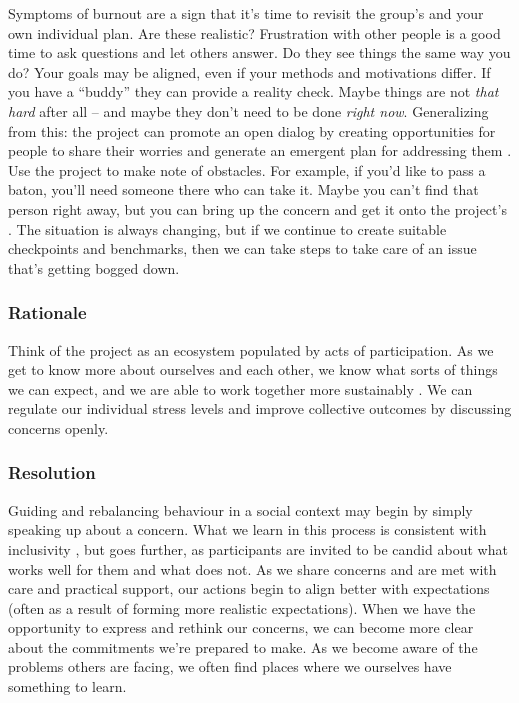 Symptoms of burnout are a sign that it's time to revisit the group's  and your own individual plan.  Are these realistic?  Frustration with other people is a good time to ask questions and let others answer.  Do they see things the same way you do?  Your goals may be aligned, even if your methods and motivations differ. If you have a ``buddy'' they can provide a reality check.   Maybe things are not \emph{that hard} after all -- and maybe they don't need to be done \emph{right now}.  Generalizing from this: the project can promote an open dialog by creating opportunities for people to share their worries and generate an emergent plan for addressing them \cite{seikkula2006dialogical}.  Use the project  to make note of obstacles.  For example, if you'd like to pass a baton, you'll need someone there who can take it.  Maybe you can't find that person right away, but you can bring up the concern and get it onto the project's .  The situation is always changing, but if we continue to create suitable checkpoints and benchmarks, then we can take steps to take care of an issue that's getting bogged down.    

\subsubsection*{Rationale}

Think of the project as an ecosystem populated by acts of participation.  As we get to know more about ourselves and each other, we know what sorts of things we can expect, and we are able to work together more sustainably \cite{ostrom2010revising}.
%
We can regulate our individual stress levels and improve collective outcomes by discussing concerns openly.

\subsubsection*{Resolution}

Guiding and rebalancing behaviour in a social context may begin by simply speaking up about a concern.  What we learn in this process is  consistent with inclusivity \cite{garrison2013toward}, but goes further, as participants are invited to be candid about what works well for them and what does not.
%
As we share concerns and are met with care and practical support, our actions begin to align better with expectations (often as a result of forming more realistic expectations).  When we have the opportunity to express and rethink our concerns, we can become more clear about the commitments we're prepared to make.  As we become aware of the problems others are facing, we often find places where we ourselves have something to learn.

